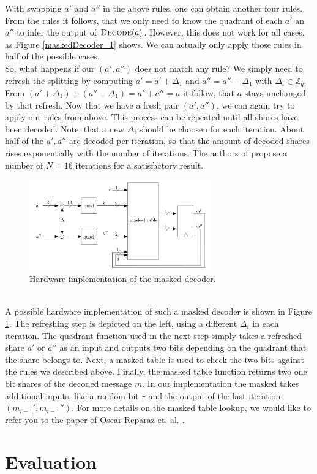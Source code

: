 With swapping \(a'\) and \(a''\) in the above rules, one can obtain another four rules. From the rules it follows, that we only need to know the quadrant of each \(a'\) an \(a''\) to infer the output of \(\textsc{Decode}(a)\). However, this does not work for all cases, as Figure \ref{maskedDecoder_1} shows. We can actually only apply those rules in half of the possible cases.\\
So, what happens if our \((a', a'')\) does not match any rule? We simply need to refresh the splitting by computing \(a' = a' + \Delta_1\) and \(a'' = a'' - \Delta_1\) with \(\Delta_i \in \mathbb{Z}_q\). From \((a' + \Delta_1) + (a'' - \Delta_1) = a' + a'' = a\) it follow, that \(a\) stays unchanged by that refresh. Now that we have a fresh pair \((a',a'')\), we can again try to apply our rules from above. This process can be repeated until all shares have been decoded. Note, that a new \(\Delta_i\) should be choosen for each iteration. About half of the \(a',a''\) are decoded per iteration, so that the amount of decoded shares rises exponentially with the number of iterations. The authors of \cite{maskedRing} propose a number of \(N = 16\) iterations for a satisfactory result.
\begin{figure}
	\centering
	\includegraphics[width=0.7\textwidth]{maskedDecoder_2.png}
	\caption{Hardware implementation of the masked decoder. \cite{maskedRing}}
	\label{maskedDecoder_2}
\end{figure}
\\A possible hardware implementation of such a masked decoder is shown in Figure \ref{maskedDecoder_2}. The refreshing step is depicted on the left, using a different \(\Delta_i\) in each iteration. The quadrant function used in the next step simply takes a refreshed share \(a'\) or \(a''\) as an input and outputs two bits depending on the quadrant that the share belongs to. Next, a masked table is used to check the two bits against the rules we described above. Finally, the masked table function returns two one bit shares of the decoded message \(\textit{m}\). In our implementation the masked takes additional inputs, like a random bit \(r\) and the output of the last iteration \((m_{i-1}',m_{i-1}'')\). For more details on the masked table lookup, we would like to refer you to the paper of Oscar Reparaz et. al. \cite{maskedRing}.


\section{Evaluation}